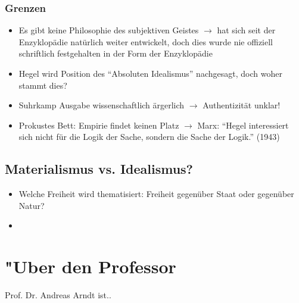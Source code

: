 \documentclass[emulatestandardclasses]{scrartcl}
\begin{document}
\subsubsection{Grenzen}

\begin{itemize}
  \item Es gibt keine Philosophie des subjektiven Geistes $\rightarrow$ hat sich seit der Enzyklopädie natürlich weiter entwickelt, doch dies wurde nie offiziell schriftlich festgehalten in der Form der Enzyklopädie
  \item Hegel wird Position des "`Absoluten Idealismus"' nachgesagt, doch woher stammt dies?
  \item Suhrkamp Ausgabe wissenschaftlich ärgerlich $\rightarrow$ Authentizität unklar! 
  \item Prokustes Bett: Empirie findet keinen Platz $\rightarrow$ Marx: "`Hegel interessiert sich nicht für die Logik der Sache, sondern die Sache der Logik."' (1943)
\end{itemize}

\subsection{Materialismus vs. Idealismus?}

\begin{itemize}
  \item Welche Freiheit wird thematisiert: Freiheit gegenüber Staat oder gegenüber Natur?
  \item 
\end{itemize}


\newpage
\section{"Uber den Professor}
Prof. Dr. Andreas Arndt ist..


\end{document}
